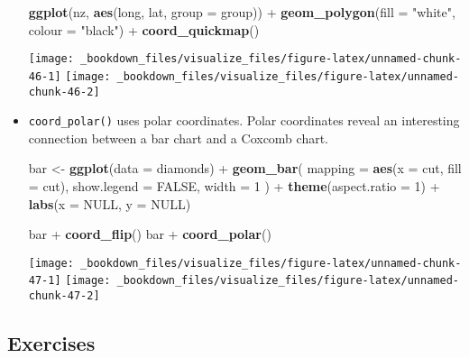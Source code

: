 \documentclass[]{book}
\newenvironment{Shaded}{\begin{snugshade}}{\end{snugshade}}
\newcommand{\KeywordTok}[1]{\textcolor[rgb]{0.13,0.29,0.53}{\textbf{{#1}}}}
\newcommand{\DataTypeTok}[1]{\textcolor[rgb]{0.13,0.29,0.53}{{#1}}}
\newcommand{\DecValTok}[1]{\textcolor[rgb]{0.00,0.00,0.81}{{#1}}}
\newcommand{\StringTok}[1]{\textcolor[rgb]{0.31,0.60,0.02}{{#1}}}
\newcommand{\OtherTok}[1]{\textcolor[rgb]{0.56,0.35,0.01}{{#1}}}
\newcommand{\NormalTok}[1]{{#1}}
\begin{document}
\begin{itemize}
\begin{Shaded}
\begin{Highlighting}[]
\KeywordTok{ggplot}\NormalTok{(nz, }\KeywordTok{aes}\NormalTok{(long, lat, }\DataTypeTok{group =} \NormalTok{group)) +}
\StringTok{  }\KeywordTok{geom_polygon}\NormalTok{(}\DataTypeTok{fill =} \StringTok{"white"}\NormalTok{, }\DataTypeTok{colour =} \StringTok{"black"}\NormalTok{) +}
\StringTok{  }\KeywordTok{coord_quickmap}\NormalTok{()}
\end{Highlighting}
\end{Shaded}

  \texttt{[image: \_bookdown\_files/visualize\_files/figure-latex/unnamed-chunk-46-1]}
  \texttt{[image: \_bookdown\_files/visualize\_files/figure-latex/unnamed-chunk-46-2]}
\item
  \texttt{coord\_polar()} uses polar coordinates. Polar coordinates
  reveal an interesting connection between a bar chart and a Coxcomb
  chart.

\begin{Shaded}
\begin{Highlighting}[]
\NormalTok{bar <-}\StringTok{ }\KeywordTok{ggplot}\NormalTok{(}\DataTypeTok{data =} \NormalTok{diamonds) +}\StringTok{ }
\StringTok{  }\KeywordTok{geom_bar}\NormalTok{(}
    \DataTypeTok{mapping =} \KeywordTok{aes}\NormalTok{(}\DataTypeTok{x =} \NormalTok{cut, }\DataTypeTok{fill =} \NormalTok{cut), }
    \DataTypeTok{show.legend =} \OtherTok{FALSE}\NormalTok{,}
    \DataTypeTok{width =} \DecValTok{1}
  \NormalTok{) +}\StringTok{ }
\StringTok{  }\KeywordTok{theme}\NormalTok{(}\DataTypeTok{aspect.ratio =} \DecValTok{1}\NormalTok{) +}
\StringTok{  }\KeywordTok{labs}\NormalTok{(}\DataTypeTok{x =} \OtherTok{NULL}\NormalTok{, }\DataTypeTok{y =} \OtherTok{NULL}\NormalTok{)}

\NormalTok{bar +}\StringTok{ }\KeywordTok{coord_flip}\NormalTok{()}
\NormalTok{bar +}\StringTok{ }\KeywordTok{coord_polar}\NormalTok{()}
\end{Highlighting}
\end{Shaded}

  \texttt{[image: \_bookdown\_files/visualize\_files/figure-latex/unnamed-chunk-47-1]}
  \texttt{[image: \_bookdown\_files/visualize\_files/figure-latex/unnamed-chunk-47-2]}
\end{itemize}

\subsection{Exercises}\label{exercises-6}
\end{document}
